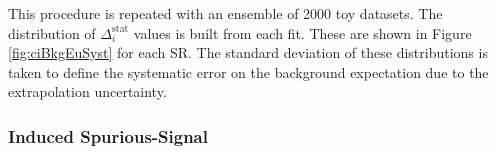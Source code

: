 This procedure is repeated with an ensemble of 2000 toy datasets.
The distribution of $\Delta_i^\text{stat}$ values is built from each fit. These are shown in Figure \ref{fig:ciBkgEuSyst} for each SR.
The standard deviation of these distributions is taken to define the systematic error on the background expectation due to the extrapolation uncertainty.

\subsubsection{Induced Spurious-Signal}
\begin{figure}[h!]
\captionsetup[subfigure]{position=b}
\centering
{}
 \\

\end{figure}
